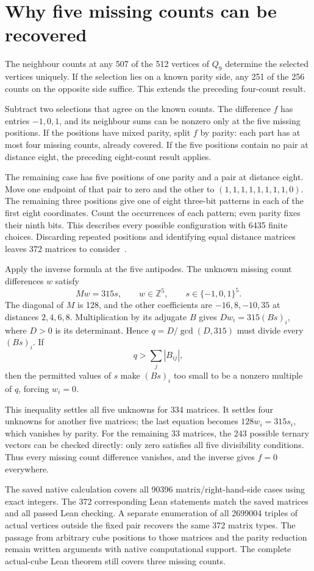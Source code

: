 \section{Why five missing counts can be recovered}
The neighbour counts at any 507 of the 512 vertices of $Q_9$ determine
the selected vertices uniquely. If the selection lies on a known
parity side, any 251 of the 256 counts on the opposite side suffice.
This extends the preceding four-count result.

Subtract two selections that agree on the known counts. The difference
$f$ has entries $-1,0,1$, and its neighbour sums can be nonzero only
at the five missing positions. If the positions have mixed parity,
split $f$ by parity: each part has at most four missing counts, already
covered. If the five positions contain no pair at distance eight,
the preceding eight-count result applies.

The remaining case has five positions of one parity and a pair at
distance eight. Move one endpoint of that pair to zero and the other
to $(1,1,1,1,1,1,1,1,0)$. The remaining three positions give one of eight
three-bit patterns in each of the first eight coordinates. Count the
occurrences of each pattern; even parity fixes their ninth bits.
This describes every possible configuration with 6435 finite choices.
Discarding repeated positions and identifying equal distance matrices
leaves 372 matrices to consider~\cite{research240}.

Apply the inverse formula at the five antipodes. The unknown missing
count differences $w$ satisfy
\[
Mw=315s,\qquad w\in\mathbb Z^5,\qquad s\in\{-1,0,1\}^5.
\]
The diagonal of $M$ is 128, and the other coefficients are
$-16,8,-10,35$ at distances $2,4,6,8$. Multiplication by its adjugate
$B$ gives $Dw_i=315(Bs)_i$, where $D>0$ is its determinant. Hence
$q=D/\gcd(D,315)$ must divide every $(Bs)_i$. If
\[
q>\sum_j|B_{ij}|,
\]
then the permitted values of $s$ make $(Bs)_i$ too small to be a nonzero
multiple of $q$, forcing $w_i=0$.

This inequality settles all five unknowns for 334 matrices. It settles
four unknowns for another five matrices; the last equation becomes
$128w_i=315s_i$, which vanishes by parity. For the remaining 33 matrices,
the 243 possible ternary vectors can be checked directly: only zero
satisfies all five divisibility conditions. Thus every missing count
difference vanishes, and the inverse gives $f=0$ everywhere.

The saved native calculation covers all 90396 matrix/right-hand-side
cases using exact integers. The 372 corresponding Lean statements
match the saved matrices and all passed Lean checking. A separate
enumeration of all 2699004 triples of actual vertices outside the fixed
pair recovers the same 372 matrix types. The passage from arbitrary cube positions to those
matrices and the parity reduction remain written arguments with
native computational support. The complete actual-cube Lean theorem
still covers three missing counts.

